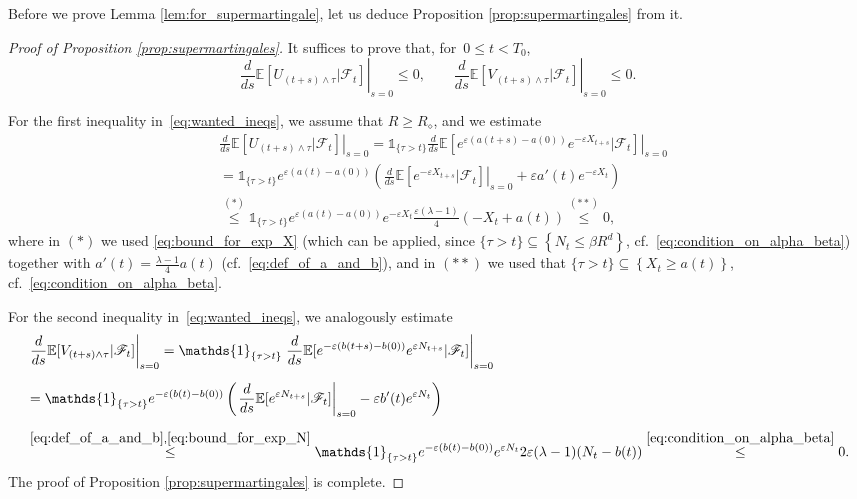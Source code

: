 \documentclass[a4paper,12pt]{article}
\begin{document}
Before we prove Lemma \ref{lem:for_supermartingale}, let us deduce Proposition \ref{prop:supermartingales} from it.


\begin{proof}[Proof of Proposition \ref{prop:supermartingales}]
It suffices to prove that, for~$0 \leq t < {T_0}$,
\begin{equation}\label{eq:wanted_ineqs}
\left. \frac{d}{ds}  \mathbb{E}[U_{(t+s) \wedge \tau}|\mathscr{F}_t] \right|_{s = 0} \leq 0,\qquad \left. \frac{d}{ds}  \mathbb{E}[V_{(t+s) \wedge \tau}|\mathscr{F}_t] \right|_{s = 0} \leq 0.
\end{equation}

For the first inequality in~\eqref{eq:wanted_ineqs}, we assume that $R\geq R_\diamond$, and we estimate
\begin{align*}
& \left. \frac{d}{ds}  \mathbb{E}[U_{(t+s) \wedge \tau}|\mathscr{F}_t] \right|_{s = 0} =
\mathds{1}_{\{\tau > t\}} \left. \frac{d}{ds}  \mathbb{E}[  e^{ \varepsilon (a(t+s) - a(0))} e^{-\varepsilon X_{t+s}}    |\mathscr{F}_t] \right|_{s = 0} \\[.2cm]
&=  \mathds{1}_{\{\tau > t\}} e^{\varepsilon(a(t) - a(0))}  \left( \left. \frac{d}{ds}  \mathbb{E}[e^{-\varepsilon X_{t + s}}|\mathscr{F}_t] \right|_{s = 0} + \varepsilon a'(t) e^{-\varepsilon X_t} \right)\\[.2cm]
&\stackrel{(*)}{\leq} \mathds{1}_{\{\tau > t\}} e^{ \varepsilon (a(t) - a(0))} e^{-\varepsilon X_{t}}   \frac{\varepsilon(\lambda - 1)}{4} \left(-X_t + a(t)\right) \stackrel{(**)}{\leq} 0,
\end{align*}
where in $(*)$ we used \eqref{eq:bound_for_exp_X} (which can be applied, since $\{\tau > t\} \subseteq \left\{ N_t \leq \beta R^d \right\} $, cf.\  \eqref{eq:condition_on_alpha_beta}) together with $a'(t)=\frac{\lambda-1}{4}a(t)$ (cf.\ \eqref{eq:def_of_a_and_b}), and in $(**)$ we used that
$\{\tau > t\} \subseteq \left\{ X_t \geq a(t) \right\} $, cf.\  \eqref{eq:condition_on_alpha_beta}.

For the second inequality in~\eqref{eq:wanted_ineqs}, we analogously estimate
\begin{align*}
&\left. \frac{d}{ds}  \mathbb{E}[V_{(t+s) \wedge \tau}|\mathscr{F}_t] \right|_{s = 0} =
\mathds{1}_{\{\tau > t\}} \left. \frac{d}{ds}  \mathbb{E}[  e^{-\varepsilon(b(t+s) - b(0))} e^{\varepsilon N_{t + s}}  |\mathscr{F}_t] \right|_{s = 0} \\[.2cm]
&=  \mathds{1}_{\{\tau > t\}} e^{-\varepsilon(b(t) - b(0))}  \left( \left. \frac{d}{ds}  \mathbb{E}[e^{\varepsilon N_{t + s}}|\mathscr{F}_t] \right|_{s = 0}  -\varepsilon b'(t) e^{\varepsilon N_t} \right)\\[.2cm]
&\stackrel{\eqref{eq:def_of_a_and_b},\eqref{eq:bound_for_exp_N} }{\leq} \mathds{1}_{\{\tau > t\}}  e^{-\varepsilon(b(t) - b(0))} e^{\varepsilon N_{t }}   2\varepsilon (\lambda - 1) (N_t - b(t) ) \stackrel{ \eqref{eq:condition_on_alpha_beta} }{\leq} 0.
\end{align*}
The proof of Proposition \ref{prop:supermartingales} is complete.
\end{proof}
\end{document}
